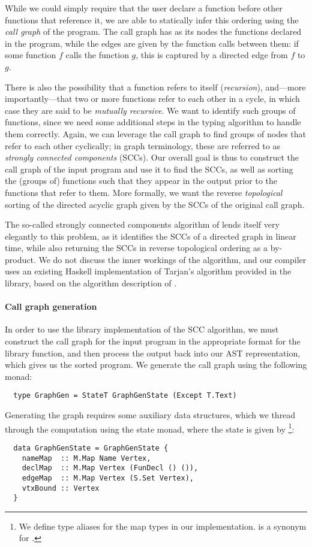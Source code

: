 While we could simply require that the user declare a function before other
functions that reference it, we are able to statically infer this ordering using
the \emph{call graph} of the program.
The call graph has as its nodes the functions declared in the program, while the
edges are given by the function calls between them: if some function $f$ calls
the function $g$, this is captured by a directed edge from $f$ to $g$.

There is also the possibility that a function refers to itself
(\emph{recursion}), and---more importantly---that two or more functions refer to
each other in a cycle, in which case they are said to be \emph{mutually
recursive}. We want to identify such groups of functions, since we need some
additional steps in the typing algorithm to handle them correctly.
Again, we can leverage the call graph to find groups of nodes that refer to each
other cyclically; in graph terminology, these are referred to as
\emph{strongly connected components} (SCCs).
Our overall goal is thus to construct the call graph of the input program and
use it to find the SCCs, as well as sorting the (groups of) functions such that
they appear in the output prior to the functions that refer to them.
More formally, we want the reverse \emph{topological} sorting of the directed
acyclic graph given by the SCCs of the original call graph.

The so-called strongly connected components algorithm of \citet{Tarjan1972}
lends itself very elegantly to this problem, as it identifies the SCCs of a
directed graph in linear time, while also returning the SCCs in reverse
topological ordering as a by-product.
We do not discuss the inner workings of the algorithm, and our compiler uses an
existing Haskell implementation of Tarjan's algorithm provided in the
 library, based on the algorithm description of
\citet{King1995}.

\paragraph{Call graph generation}
In order to use the library implementation of the SCC algorithm, we must
construct the call graph for the input program in the appropriate format for the
library function, and then process the output back into our AST representation,
which gives us the sorted program.
We generate the call graph using the following monad:
\begin{verbatim}
  type GraphGen = StateT GraphGenState (Except T.Text)
\end{verbatim}
%
Generating the graph requires some auxiliary data structures, which we thread
through the computation using the state monad, where the state is given by
\footnote{We define type aliases for the map types in our
implementation.  is a synonym for .}:
\begin{verbatim}
  data GraphGenState = GraphGenState {
    nameMap  :: M.Map Name Vertex,
    declMap  :: M.Map Vertex (FunDecl () ()),
    edgeMap  :: M.Map Vertex (S.Set Vertex),
    vtxBound :: Vertex
  }
\end{verbatim}




